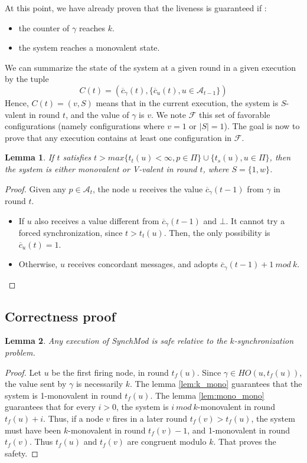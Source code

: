 \documentclass{article}
\newtheorem{lemma}{Lemma}[section]
\newcommand{\cent}{\gamma}
\newcommand{\ts}{t_{s}}
\newcommand{\tf}{t_{f}}
\newcommand{\try}{t_{t}}
\begin{document}
\noindent At this point, we have already proven that the liveness is guaranteed if :
\begin{itemize}
	\item the counter of $\cent$ reaches $k$.
	\item the system reaches a monovalent state.
\end{itemize}

We can summarize the state of the system at a given round in a given execution by the tuple
$$C(t) = (\overline{c}_\cent(t), \{\overline{c}_u(t), u \in \mathcal{A}_{t-1}\})$$
Hence, $C(t) = (v, S)$ means that in the current execution, the system is $S$-valent in round $t$, and the value of $\cent$ is $v$.
We note $\mathcal{F}$ this set of favorable configurations (namely configurations where $v = 1$ or $| S | = 1$).
The goal is now to prove that any execution contains at least one configuration in $\mathcal{F}$.

\begin{lemma}\label{lem:mono_bi}
	If $t$ satisfies $t > max \{\try(u) < \infty, p \in \Pi\} \cup \{\ts(u), u \in \Pi\}$,
	then the system is either monovalent or V-valent in round $t$, where $S = \{1, w\}$.
\end{lemma}
\begin{proof}
	Given any $p \in \mathcal{A}_t$, the node $u$ receives the value $\overline{c}_\cent(t-1)$ from $\cent$ in round $t$.
	\begin{itemize}
		\item If $u$ also receives a value different from $\overline{c}_\cent(t-1)$ and $\bot$.
			It cannot try a forced synchronization, since $t > \try(u)$.
			Then, the only possibility is $\overline{c}_u(t) = 1$.
		\item Otherwise, $u$ receives concordant messages, and adopts $\overline{c}_\cent(t-1)+1~mod~k$.
	\end{itemize}
\end{proof}

\subsection{Correctness proof}
\begin{lemma}\label{lem:safety}
	Any execution of SynchMod is safe relative to the $k$-synchronization problem.
\end{lemma}
\begin{proof}
	Let $u$ be the first firing node, in round $\tf(u)$.
	Since $\cent \in HO(u,\tf(u))$, the value sent by $\cent$ is necessarily $k$.
	The lemma \ref{lem:k_mono} guarantees that the system is 1-monovalent in round $\tf(u)$.
	The lemma \ref{lem:mono_mono} guarantees that for every $i > 0$, the system is $i~mod~k$-monovalent in round $\tf(u)+i$.
	Thus, if a node $v$ fires in a later round $\tf(v) > \tf(u)$, the system must have been $k$-monovalent in round $\tf(v)-1$,
	and 1-monovalent in round $\tf(v)$. Thus $\tf(u)$ and $\tf(v)$ are congruent modulo $k$.
	That proves the safety.
\end{proof}
\end{document}

